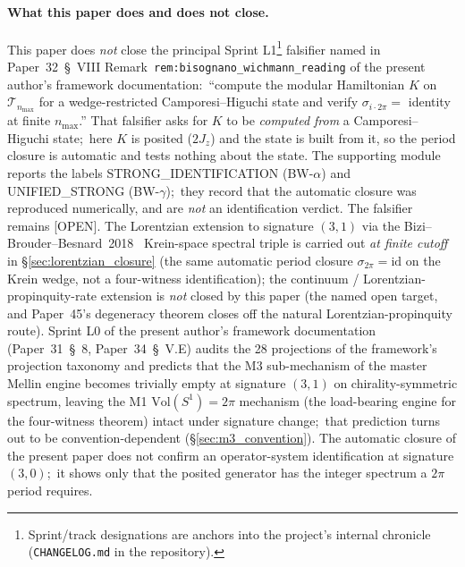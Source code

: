 \documentclass[11pt,a4paper]{article}
\theoremstyle{plain}
\theoremstyle{definition}
\newcommand{\nmax}{n_{\max}}
\newcommand{\Tcal}{\mathcal{T}}
\newcommand{\Vol}{\mathrm{Vol}}
\begin{document}
\paragraph{What this paper does and does not close.}
This paper does \emph{not} close the principal Sprint
L1\footnote{Sprint/track designations are anchors into the project's internal chronicle (\texttt{CHANGELOG.md} in the repository).} falsifier named in
Paper~32~\S~VIII Remark~\texttt{rem:bisognano\_wichmann\_reading} of
the present author's framework documentation:\
``compute the modular Hamiltonian $K$ on $\Tcal_{\nmax}$ for a
wedge-restricted Camporesi--Higuchi state and verify $\sigma_{i \cdot 2\pi}
= $ identity at finite $\nmax$.'' That falsifier asks for $K$ to be
\emph{computed from} a Camporesi--Higuchi state;\ here $K$ is posited
($2J_z$) and the state is built from it, so the period closure is
automatic and tests nothing about the state.  The supporting module
reports the labels STRONG\_IDENTIFICATION (BW-$\alpha$) and
UNIFIED\_STRONG (BW-$\gamma$);\ they record that the automatic closure
was reproduced numerically, and are \emph{not} an identification
verdict.  The falsifier remains [OPEN].
The Lorentzian extension to signature $(3, 1)$ via the
Bizi--Brouder--Besnard~2018~\cite{bizi_brouder_besnard2018} Krein-space
spectral triple is carried out \emph{at finite cutoff} in
\S\ref{sec:lorentzian_closure} (the same automatic period closure
$\sigma_{2\pi} = \mathrm{id}$ on the Krein wedge, not a four-witness
identification); the
continuum / Lorentzian-propinquity-rate extension is \emph{not} closed
by this paper (the named open target, and Paper~45's degeneracy theorem
closes off the natural Lorentzian-propinquity route). Sprint L0 of
the present author's framework documentation
(Paper~31~\S~8, Paper~34~\S~V.E) audits the 28 projections of the
framework's projection taxonomy and predicts that the M3
sub-mechanism of the master Mellin engine becomes trivially empty at
signature $(3, 1)$ on chirality-symmetric spectrum, leaving the M1
$\Vol(S^1) = 2\pi$ mechanism (the load-bearing engine for the
four-witness theorem) intact under signature change;\ that prediction
turns out to be convention-dependent (\S\ref{sec:m3_convention}). The automatic
closure of the present paper does not confirm an operator-system
identification at signature $(3, 0)$;\ it shows only that the
posited generator has the integer spectrum a $2\pi$ period requires.
\end{document}
